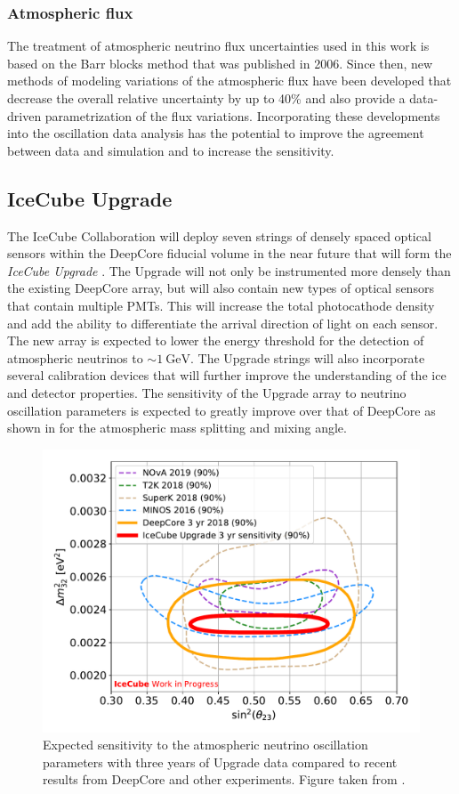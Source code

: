 \subsubsection{Atmospheric flux}
The treatment of atmospheric neutrino flux uncertainties used in this work is based on the Barr blocks method that was published in 2006\cite{Barr2006}.
Since then, new methods of modeling variations of the atmospheric flux have been developed that decrease the overall relative uncertainty by up to 40\% and also provide a data-driven parametrization of the flux variations.
Incorporating these developments into the oscillation data analysis has the potential to improve the agreement between data and simulation and to increase the sensitivity.

\subsection{IceCube Upgrade}
The IceCube Collaboration will deploy seven strings of densely spaced optical sensors within the DeepCore fiducial volume in the near future that will form the \emph{IceCube Upgrade} .
The Upgrade will not only be instrumented more densely than the existing DeepCore array, but will also contain new types of optical sensors that contain multiple PMTs.
This will increase the total photocathode density and add the ability to differentiate the arrival direction of light on each sensor.
The new array is expected to lower the energy threshold for the detection of atmospheric neutrinos to $\sim\SI{1}{\giga\electronvolt}$.
The Upgrade strings will also incorporate several calibration devices that will further improve the understanding of the ice and detector properties.
The sensitivity of the Upgrade array to neutrino oscillation parameters is expected to greatly improve over that of DeepCore as shown in  for the atmospheric mass splitting and mixing angle.
\begin{figure}
    \centering
    \includegraphics[width=0.7\linewidth]{figures/summary/June26_Upgrade_NuMu_Disappearance_Sensitivity.pdf}
    \caption{Expected sensitivity to the atmospheric neutrino oscillation parameters with three years of Upgrade data compared to recent results from DeepCore and other experiments. Figure taken from \cite{icecube_upgrade}.\label{fig:upgrade-sensitivity}}
\end{figure}


